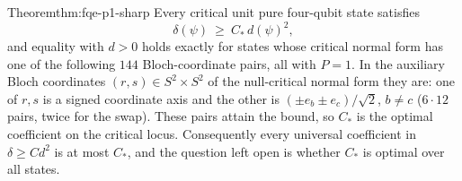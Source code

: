 \begin{restated}{Theorem}{thm:fqe-p1-sharp}
Every critical unit pure four-qubit state satisfies
\[
 \delta(\psi)\ \ge\ C_*\,d(\psi)^2 ,
\]
and equality with $d>0$ holds exactly for states whose critical normal form has
one of the following $144$ Bloch-coordinate pairs, all with $P=1$. In the auxiliary Bloch coordinates $(r,s)\in S^2\times S^2$ of the null-critical normal form they are: one of $r,s$ is a signed
coordinate axis and the other is $(\pm e_b\pm e_c)/\sqrt2$, $b\ne c$ ($6\cdot12$ pairs, twice for the swap).
These pairs attain the bound, so $C_*$ is the optimal coefficient on the critical locus. Consequently every universal coefficient in
$\delta\ge Cd^2$ is at most $C_*$, and the question left open is whether $C_*$ is optimal over all states.
\end{restated}


